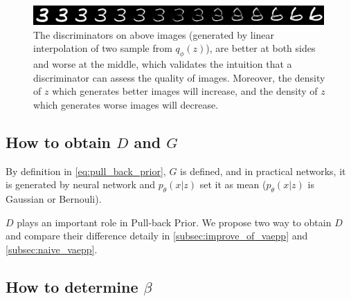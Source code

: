 \begin{figure}[tb]
	\centering
	\includegraphics[width=0.9\columnwidth]{../figures/interpolate}
	\caption{
	The discriminators on above images (generated by linear interpolation of two sample from $q_\phi(z)$), are better at both sides and worse at the middle, which validates the intuition that a discriminator can assess the quality of images. Moreover, the density of $z$ which generates better images will increase, and the density of $z$ which generates worse images will decrease. 
	}
	\label{fig:interpolate}
\end{figure}

\subsection{How to obtain $D$ and $G$}\label{subsec:determine_D_and_G}
By definition in \cref{eq:pull_back_prior}, $G$ is defined, and in practical networks, it is generated by neural network and $p_\theta(x|z)$ set it as mean (\EG $p_\theta(x|z)$ is Gaussian or Bernouli). 

$D$ plays an important role in Pull-back Prior. We propose two way to obtain $D$ and compare their difference detaily in \cref{subsec:improve_of_vaepp} and \cref{subsec:naive_vaepp}. 

\subsection{How to determine $\beta$}\label{subsec:determine_beta}

